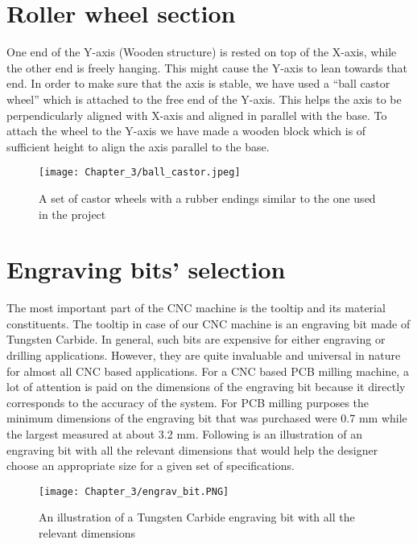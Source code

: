 \section{Roller wheel section}

One end of the Y-axis (Wooden structure) is rested on top of the X-axis, while the other end is freely hanging. This might cause the Y-axis to lean towards that end. In order to make sure that the axis is stable, we have used a “ball castor wheel” which is attached to the free end of the Y-axis. This helps the axis to be perpendicularly aligned with X-axis and aligned in parallel with the base. To attach the wheel to the Y-axis we have made a wooden block which is of sufficient height to align the axis parallel to the base.

\begin{figure}[h]
    \centering
    \texttt{[image: Chapter\_3/ball\_castor.jpeg]}
    \caption{A set of castor wheels with a rubber endings similar to the one used in the project}
    \label{fig:ballcastor}
\end{figure}

\section{Engraving bits' selection}

The most important part of the CNC machine is the tooltip and its material constituents. The tooltip in case of our CNC machine is an engraving bit made of Tungsten Carbide. In general, such bits are expensive for either engraving or drilling applications. However, they are quite invaluable and universal in nature for almost all CNC based applications. For a CNC based PCB milling machine, a lot of attention is paid on the dimensions of the engraving bit because it directly corresponds to the accuracy of the system. For PCB milling purposes the minimum dimensions of the engraving bit that was purchased were 0.7 mm while the largest measured at about 3.2 mm. Following is an illustration of an engraving bit with all the relevant dimensions that would help the designer choose an appropriate size for a given set of specifications. 

\begin{figure}[h]
    \centering
    \texttt{[image: Chapter\_3/engrav\_bit.PNG]}
    \caption{An illustration of a Tungsten Carbide engraving bit with all the relevant dimensions}
    \label{fig:ebit}
\end{figure}

